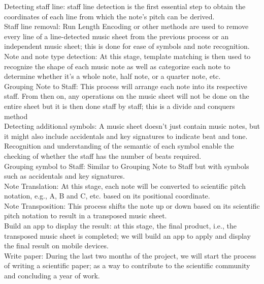 \documentclass[a4paper,12pt]{report}
\begin{document}
Detecting staff line: staff line detection is the first essential step to obtain
the coordinates of each line from which the note's pitch can be derived.\\

Staff line removal: Run Length Encoding or other methods are used to remove
every line of a line-detected music sheet from the previous process or an
independent music sheet; this is done for ease of symbols and note recognition.\\

Note and note type detection: At this stage, template matching is then used to
recognize the shape of each music note as well as categorize each note to
determine whether it's a whole note, half note, or a quarter note, etc.\\

Grouping Note to Staff: This process will arrange each note into its respective
staff. From then on, any operations on the music sheet will not be done on the entire sheet
but it is then done staff by staff; this is a divide and conquers method\\

Detecting additional symbols: A music sheet doesn't just contain music notes, but
it might also include accidentals and key signatures to indicate beat and tone.
Recognition and understanding of the semantic of each symbol enable the checking
of whether the staff has the number of beats required.\\

Grouping symbol to Staff: Similar to Grouping Note to Staff but with symbols such as
accidentals and key signatures.\\

Note Translation: At this stage, each note will be converted to
scientific pitch notation, e.g., A, B and C, etc. based on its positional
coordinate.\\

Note Transposition: This process shifts the note up or down based on its
scientific pitch notation to result in a transposed music sheet.\\

Build an app to display the result: at this stage, the final product, i.e., the
transposed music sheet is completed; we will build an app to apply and display
the final result on mobile devices.\\

Write paper: During the last two months of the project, we will start the
process of writing a scientific paper; as a way to contribute to the scientific
community and concluding a year of work.\\


\printbibliography
\end{document}

